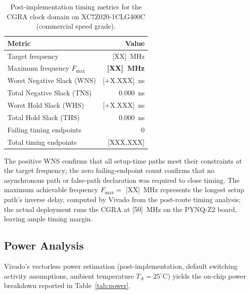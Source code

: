 \begin{table}[!htbp]
\centering
\caption{Post-implementation timing metrics for the CGRA clock domain
on XC7Z020-1CLG400C (commercial speed grade).}
\label{tab:timing}
\small
\setlength{\tabcolsep}{8pt}
\begin{tabular}{@{}l r@{}}
\toprule
\textbf{Metric} & \textbf{Value} \\
\midrule
Target frequency                       & [XX]~MHz \\
Maximum frequency $F_{\text{max}}$     & \textbf{[XX]~MHz} \\
Worst Negative Slack (WNS)             & [+X.XXX]~ns \\
Total Negative Slack (TNS)             & 0.000~ns \\
Worst Hold Slack (WHS)                 & [+X.XXX]~ns \\
Total Hold Slack (THS)                 & 0.000~ns \\
Failing timing endpoints               & 0 \\
Total timing endpoints                 & [XXX{,}XXX] \\
\bottomrule
\end{tabular}
\end{table}

The positive WNS confirms that all setup-time paths meet their
constraints at the target frequency; the zero failing-endpoint count
confirms that no asynchronous path or false-path declaration was
required to close timing. The maximum achievable frequency
$F_{\text{max}} = $ [XX]~MHz represents the longest setup path's
inverse delay, computed by Vivado from the post-route timing
analysis; the actual deployment runs the CGRA at [50]~MHz on the
PYNQ-Z2 board, leaving ample timing margin.

\subsection{Power Analysis}
\label{ssec:power}

Vivado's vectorless power estimation (post-implementation, default
switching activity assumptions, ambient temperature
$T_A = 25^{\circ}$C) yields the on-chip power breakdown reported in
Table~\ref{tab:power}.

